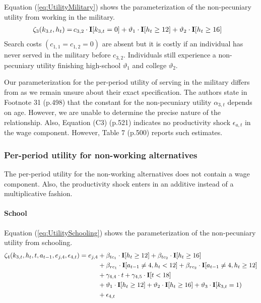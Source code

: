 \noindent Equation (\ref{eq:UtilityMilitary}) shows the parameterization of the non-pecuniary utility from working in the military.
%
\begin{align}\label{eq:UtilityMilitary}
\zeta_{3}( k_{3.t}, h_t)  = \,& c_{3,2} \cdot {\textbf{I}}[k_{3,t} = 0]+ \vartheta_1 \cdot {\textbf{I}}[h_t \geq 12] + \vartheta_2 \cdot {\textbf{I}}[h_t \geq 16]
\end{align}
%
Search costs $(c_{1, 1} = c_{1, 2} = 0)$ are absent but it is costly if an individual has never served in the military before $c_{3,2}$. Individuals still experience a non-pecuniary utility finishing high-school $\vartheta_1$ and college $\vartheta_2$.


\begin{Remark} Our parameterization for the per-period utility of serving in the military differs from \citet{Keane.1997} as we remain unsure about their exact specification. The authors state in Footnote 31 (p.498) that the constant for the non-pecuniary utility $\alpha_{3,t}$ depends on age. However, we are unable to determine the precise nature of the relationship. Also, Equation (C3) (p.521) indicates no productivity shock $\epsilon_{a,t}$ in the wage component. However, Table 7 (p.500) reports such estimates.
\end{Remark}
\FloatBarrier\subsubsection*{Per-period utility for non-working alternatives}
The per-period utility for the non-working alternatives does not contain a wage component. Also, the productivity shock enters in an additive instead of a multiplicative fashion.
\FloatBarrier\paragraph*{School}
Equation (\ref{eq:UtilitySchooling}) shows the parameterization of the non-pecuniary utility from schooling.
%
\begin{align}\label{eq:UtilitySchooling}
	\zeta_4(k_{3,t}, h_t, t, a_{t-1}, e_{j,4}, \epsilon_{4,t})  = e_{j,4} & + \beta_{tc_1} \cdot {\textbf{I}}[h_t \geq 12] + \beta_{tc_2} \cdot {\textbf{I}}[h_t \geq 16]   \\\nonumber
    							  & + \beta_{rc_1} \cdot {\textbf{I}}[a_{t-1} \neq 4, h_t < 12] + \beta_{rc_2} \cdot {\textbf{I}}[a_{t-1} \neq 4, h_t \geq 12] \\\nonumber
    							  & + \gamma_{4,4} \cdot t + \gamma_{4,5} \cdot {\textbf{I}}[t < 18] 																					  \\\nonumber
     							  & + \vartheta_1 \cdot {\textbf{I}}[h_t \geq 12] + \vartheta_2 \cdot {\textbf{I}}[h_t \geq 16] + \vartheta_3 \cdot {\textbf{I}}[k_{3,t} = 1)\\\nonumber
      							& + \epsilon_{4,t}
\end{align}
